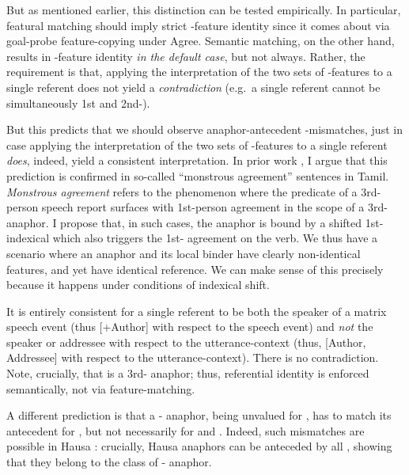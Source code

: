 \documentclass[output=paper, modfonts, nonflat]{langsci/langscibook}
\begin{document}
  But as mentioned earlier, this distinction can be tested
  empirically. In particular, featural matching should imply strict
  \ph-feature identity since it comes about via goal-probe
  feature-copying under Agree. Semantic matching, on the other hand,
  results in \ph-feature identity \emph{in the default case}, but not
  always. Rather, the requirement is that, applying the interpretation
  of the two sets of \ph-features to a single referent does not yield
  a \emph{contradiction} (e.g.\ a single referent cannot be
  simultaneously 1st and 2nd-\person). 

  But this predicts that we should observe anaphor-antecedent
  \ph-mismatches, just in case applying the interpretation of the two
  sets of \ph-features to a single referent \emph{does}, indeed, yield
  a consistent interpretation. In prior work \citep{sundaresan:2012,
    sundaresan:2018}, I argue that this prediction is confirmed in
  so-called ``monstrous agreement'' sentences in Tamil. {\itshape Monstrous
    agreement} refers to the phenomenon where the predicate of a
  3rd-person speech report surfaces with 1st-person agreement in the
  scope of a 3rd-\person{} anaphor. I propose that, in such cases, the
  anaphor \taan{} is bound by a shifted 1st-\person{} indexical
  \citep{schlenker:2003, anand:2006} which also triggers the
  1st-\person{} agreement on the verb. We thus have a scenario where
  an anaphor and its local binder have clearly non-identical \person{}
  features, and yet have identical reference.  We can make sense of
  this precisely because it happens under conditions of indexical
  shift.
  
  It is entirely consistent for a single referent to be both the
  speaker of a matrix speech event (thus [+Author] with respect to the
  speech event) and \textit{not} the speaker or addressee with respect
  to the utterance-context (thus, [\textminus Author, \textminus Addressee] with respect
  to the utterance-context). There is no contradiction. Note,
  crucially, that \taan{} is a 3rd-\person{} anaphor; thus,
  referential identity is enforced semantically, not via
  feature-matching.
  

  A different prediction is that a \nul-\person{} anaphor, being
  unvalued for \person, has to match its antecedent for \person, but
  not necessarily for \num{} and \gender. Indeed, such \num{}
  mismatches are possible in Hausa \citep[42, 8]{haspelmath:2008}: crucially, Hausa anaphors can be anteceded by
  all \person{} \citep{Newman:2000}, showing that they belong to the
  class of \nul-\person{} anaphor.
\end{document}
